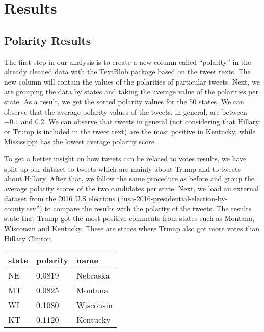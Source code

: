\documentclass{article}
\begin{document}
      
  \section{Results}
  \subsection{Polarity Results}
  The first step in our analysis is to create a new column called
  “polarity” in the already cleaned data with the TextBlob package
  based on the tweet texts. The new column will contain the values of
  the polarities of particular tweets. Next, we are grouping the data
  by states and taking the average value of the polarities per
  state. As a result, we get the sorted polarity values for the 50
  states. We can observe that the average polarity values of the
  tweets, in general, are between $-0.1$ and $0.2$. We can observe that
  tweets in general (not considering that Hillary or Trump is included
  in the tweet text) are the most positive in Kentucky, while
  Mississippi has the lowest average polarity score.

  To get a better insight on how tweets can be related to votes
  results, we have split up our dataset to tweets which are mainly
  about Trump and to tweets about Hillary. After that, we follow the
  same procedure as before and group the average polarity scores of
  the two candidates per state. Next, we load an external dataset from
  the 2016 U.S elections
  (“usa-2016-presidential-election-by-county.csv”) to compare the  
  results with the polarity of the tweets. The results state that
  Trump got the most positive comments from states such as Montana,
  Wisconsin and Kentucky. These are states where Trump also got more
  votes than Hillary Clinton.  
  
  \begin{table}[H]
    \centering
    \begin{tabular}{||p{2cm} p{3cm} p{3.5cm} ||}
      \hline
      state & polarity & name \\ \hline
      NE & 0.0819 & Nebraska \\
      MT & 0.0825 & Montana \\
      WI & 0.1080 & Wisconsin \\
      KT & 0.1120 & Kentucky \\
      \hline
    \end{tabular}
  \end{table}
\end{document}
